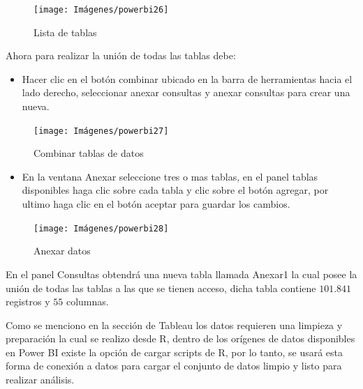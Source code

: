 \documentclass[
]{book}
\providecommand{\tightlist}{%
  \setlength{\itemsep}{0pt}\setlength{\parskip}{0pt}}
\begin{document}
\begin{figure}

{\centering \texttt{[image: Imágenes/powerbi26]} 

}

\caption{Lista de tablas}\label{fig:listamicrodatos-fig}
\end{figure}

Ahora para realizar la unión de todas las tablas debe:

\begin{itemize}
\tightlist
\item
  Hacer clic en el botón combinar ubicado en la barra de herramientas hacia el lado derecho, seleccionar anexar consultas y anexar consultas para crear una nueva.
\end{itemize}

\begin{figure}

{\centering \texttt{[image: Imágenes/powerbi27]} 

}

\caption{Combinar tablas de datos}\label{fig:combinardatos-fig}
\end{figure}

\begin{itemize}
\tightlist
\item
  En la ventana Anexar seleccione tres o mas tablas, en el panel tablas disponibles haga clic sobre cada tabla y clic sobre el botón agregar, por ultimo haga clic en el botón aceptar para guardar los cambios.
\end{itemize}

\begin{figure}

{\centering \texttt{[image: Imágenes/powerbi28]} 

}

\caption{Anexar datos}\label{fig:anexardatos-fig}
\end{figure}

En el panel Consultas obtendrá una nueva tabla llamada Anexar1 la cual posee la unión de todas las tablas a las que se tienen acceso, dicha tabla contiene \(101.841\) registros y \(55\) columnas.

Como se menciono en la sección de Tableau los datos requieren una limpieza y preparación la cual se realizo desde R, dentro de los orígenes de datos disponibles en Power BI existe la opción de cargar scripts de R, por lo tanto, se usará esta forma de conexión a datos para cargar el conjunto de datos limpio y listo para realizar análisis.
\end{document}
